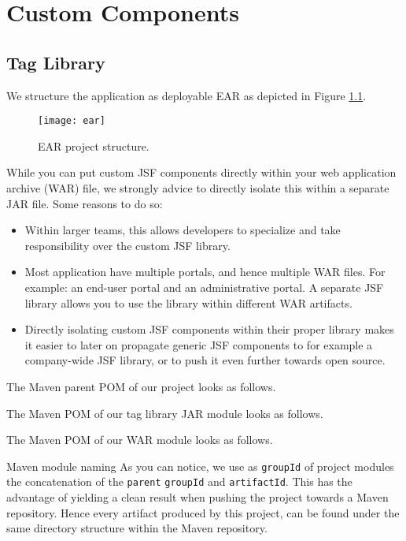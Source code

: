 %

\chapter{Custom Components}

\section{Tag Library}

We structure the application as deployable EAR as depicted in Figure \ref{fig:ear}.
\begin{figure}[htbp]
	\begin{center}
		\texttt{[image: ear]}
		\caption{EAR project structure.}
		\label{fig:ear}
	\end{center}
\end{figure}
While you can put custom JSF components directly within your web application archive (WAR) file,
we strongly advice to directly isolate this within a separate JAR file.
Some reasons to do so:
\begin{itemize}
	\item Within larger teams, this allows developers to specialize and take responsibility over the custom JSF library.
	\item Most application have multiple portals, and hence multiple WAR files. For example: an end-user portal and an administrative portal. A separate JSF library allows you to use the library within different WAR artifacts.
	\item Directly isolating custom JSF components within their proper library makes it easier to later on propagate generic JSF components to for example a company-wide JSF library, or to push it even further towards open source.
\end{itemize}
The Maven parent POM of our project looks as follows.


The Maven POM of our tag library JAR module looks as follows.


The Maven POM of our WAR module looks as follows.

\begin{TIP}{Maven module naming}
	As you can notice, we use as \texttt{groupId} of project modules the concatenation
	of the \texttt{parent} \texttt{groupId} and \texttt{artifactId}.
	This has the advantage of yielding a clean result when pushing the project towards a Maven repository.
	Hence every artifact produced by this project, can be found under the same directory structure within the Maven repository.
\end{TIP}

